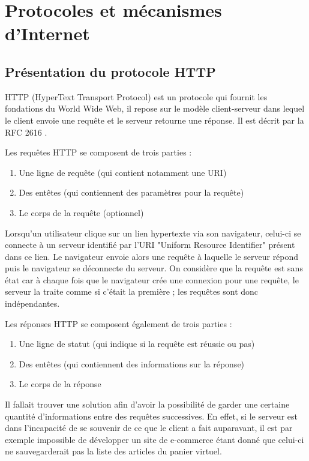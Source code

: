 \chapter{Protocoles et mécanismes d'Internet}

\section{Présentation du protocole HTTP}
HTTP (HyperText Transport Protocol) \cite{Obo_CNP3} est un protocole qui fournit les fondations du World Wide Web, il repose sur le modèle client-serveur dans lequel le client envoie une requête et le serveur retourne une réponse. Il est décrit par la RFC 2616 \cite{IETF_RFC2616}.

Les requêtes HTTP se composent de trois parties :
\begin{enumerate}
	\item Une ligne de requête (qui contient notamment une URI)
	\item Des entêtes (qui contiennent des paramètres pour la requête)
	\item Le corps de la requête (optionnel)
	\newline
\end{enumerate}

Lorsqu'un utilisateur clique sur un lien hypertexte via son navigateur, celui-ci se connecte à un serveur identifié par l'URI "Uniform Resource Identifier" présent dans ce lien. Le navigateur envoie alors une requête à laquelle le serveur répond puis le navigateur se déconnecte du serveur. On considère que la requête est sans état car à chaque fois que le navigateur crée une connexion pour une requête, le serveur la traite comme si c'était la première ; les requêtes sont donc indépendantes.

Les réponses HTTP se composent également de trois parties :
\begin{enumerate}
	\item Une ligne de statut (qui indique si la requête est réussie ou pas)
	\item Des entêtes (qui contiennent des informations sur la réponse)
	\item Le corps de la réponse
	\newline
\end{enumerate}

Il fallait trouver une solution afin d'avoir la possibilité de garder une certaine quantité d'informations entre des requêtes successives. En effet, si le serveur est dans l'incapacité de se souvenir de ce que le client a fait auparavant, il est par exemple impossible de développer un site de e-commerce étant donné que celui-ci ne sauvegarderait pas la liste des articles du panier virtuel.

